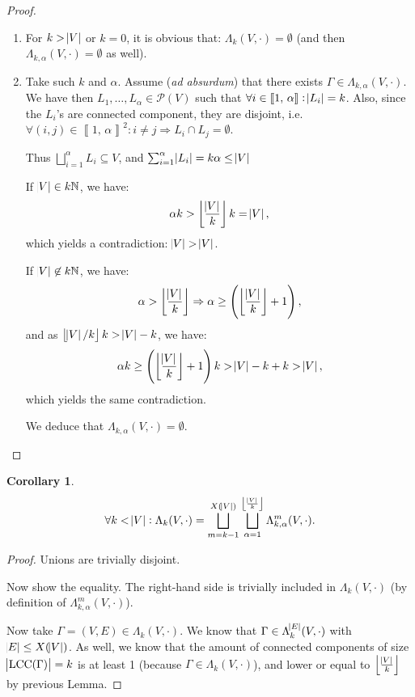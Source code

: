 \documentclass{article}
\newtheorem{corollary}[lemma]{Corollary}
\theoremstyle{definition}
\theoremstyle{remark}
\DeclareMathOperator{\LCC}{LCC}
\newcommand{\N}{\mathbb N}
\newcommand{\intint}[2]{\left\llbracket#1, \, #2\right\rrbracket}
\newcommand{\floor}[1]{\left\lfloor#1\right\rfloor}
\begin{document}
		\begin{proof}~
		\begin{enumerate}
			\item For $k > \abs V$ or $k=0$, it is obvious that: $\Lambda_k(V, \cdot) = \emptyset$ (and then $\Lambda_{k,\alpha}(V, \cdot) = \emptyset$ as well).
			\item Take such $k$ and $\alpha$. Assume (\textit{ad absurdum}) that there exists $\Gamma \in \Lambda_{k, \alpha}(V, \cdot)$. We have then
			$L_1, \ldots, L_\alpha \in \mathcal P(V)$ such that $\forall i \in \intint 1\alpha : \abs {L_i} = k$. Also, since the $L_i$'s are connected component,
			they are disjoint, i.e. $\forall (i, j) \in \intint 1\alpha^2 : i \neq j \Rightarrow L_i \cap L_j = \emptyset$.

			Thus $\bigsqcup_{i=1}^\alpha L_i \subseteq V$, and $\sum_{i=1}^\alpha \abs {L_i} = k\alpha \leq \abs V$

			If $\abs V \in k\N$, we have:
			\[\alpha k > \floor {\frac {\abs V}k}k = \abs V,\]
			which yields a contradiction: $\abs V > \abs V$.

			If $\abs V \not \in k\N$, we have:
			\[\alpha > \floor {\frac {\abs V}k} \Rightarrow \alpha \geq \left(\floor {\frac {\abs V}k}+1\right),\]
			and as $\floor {\abs V/k}k > \abs V-k$, we have:
			\[\alpha k \geq \left(\floor {\frac {\abs V}k}+1\right)k > \abs V - k + k > \abs V,\]
			which yields the same contradiction.

			We deduce that $\Lambda_{k,\alpha}(V, \cdot) = \emptyset$.
		\end{enumerate}
		\end{proof}

		\begin{corollary}
		\[\forall k < \abs V : \Lambda_k(V, \cdot) = \bigsqcup_{m=k-1}^{X(\abs V)}\bigsqcup_{\alpha=1}^{\floor {\frac {\abs V}k}}\Lambda_{k,\alpha}^m(V, \cdot).\]
		\end{corollary}

		\begin{proof} Unions are trivially disjoint.

		Now show the equality. The right-hand side is trivially included in $\Lambda_k(V, \cdot)$ (by definition of $\Lambda_{k,\alpha}^m(V, \cdot)$).

		Now take $\Gamma = (V, E) \in \Lambda_k(V, \cdot)$. We know that $\Gamma \in \Lambda_k^{\abs E}(V, \cdot)$ with $\abs E \leq X(\abs V)$. As well, we know that the amount
		of connected components of size $\abs {\LCC(\Gamma)} = k$ is at least 1 (because $\Gamma \in \Lambda_k(V, \cdot)$), and lower or equal to
		$\floor {\frac {\abs V}k}$ by previous Lemma.
		\end{proof}
\end{document}
